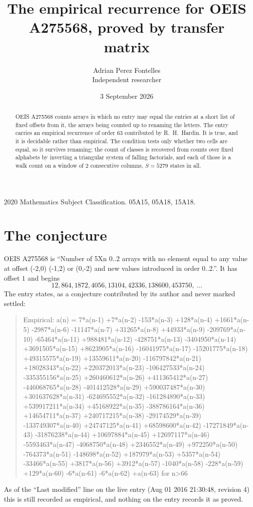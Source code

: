 \documentclass[11pt,a4paper]{article}
\title{The empirical recurrence for OEIS A275568, proved by transfer matrix}
\author{Adrian Perez Fontelles\\ \small Independent researcher}
\date{3 September 2026}
\theoremstyle{plain}
\theoremstyle{definition}
\begin{document}
\maketitle

\begin{abstract}
OEIS A275568 counts arrays in which no entry may equal the entries at a short list of fixed offsets
from it, the arrays being counted up to renaming the letters. The entry carries an empirical
recurrence of order $63$ contributed by R.~H.~Hardin. It is true, and it is decidable
rather than empirical. The condition tests only whether two cells are equal, so it survives
renaming; the count of classes is recovered from counts over fixed alphabets by inverting a
triangular system of falling factorials, and each of those is a walk count on a window of
$2$ consecutive columns, $S=5279$ states in all.
\end{abstract}

\noindent\small 2020 Mathematics Subject Classification. 05A15, 05A18, 15A18.\normalsize

\section{The conjecture}

OEIS A275568 is ``Number of 5Xn 0..2 arrays with no element equal to any value at offset (-2,0) (-1,2) or (0,-2) and new values introduced in order 0..2.''. It has offset $1$ and begins
\[
12, 864, 1872, 4056, 13104, 42336, 138600, 453750,\ \dots
\]
The entry states, as a conjecture contributed by its author and never marked settled:
\begin{quote}
Empirical: a(n) = 7*a(n-1) +7*a(n-2) -153*a(n-3) +128*a(n-4) +1661*a(n-5) -2987*a(n-6) -11147*a(n-7) +31265*a(n-8) +44933*a(n-9) -209769*a(n-10) -65464*a(n-11) +988481*a(n-12) -428751*a(n-13) -3404950*a(n-14) +3691505*a(n-15) +8623905*a(n-16) -16041975*a(n-17) -15201775*a(n-18) +49315575*a(n-19) +13559611*a(n-20) -116797842*a(n-21) +18028343*a(n-22) +220372013*a(n-23) -106427533*a(n-24) -335355156*a(n-25) +260460612*a(n-26) +411365412*a(n-27) -446068765*a(n-28) -401412528*a(n-29) +590037487*a(n-30) +301637628*a(n-31) -624695552*a(n-32) -161284890*a(n-33) +539917211*a(n-34) +45168922*a(n-35) -388786164*a(n-36) +14654711*a(n-37) +240717215*a(n-38) -29174529*a(n-39) -133749307*a(n-40) +24747125*a(n-41) +68598600*a(n-42) -17271849*a(n-43) -31876238*a(n-44) +10697884*a(n-45) +12697117*a(n-46) -5593463*a(n-47) -4068750*a(n-48) +2346552*a(n-49) +972250*a(n-50) -764373*a(n-51) -148698*a(n-52) +187979*a(n-53) +5357*a(n-54) -33466*a(n-55) +3817*a(n-56) +3912*a(n-57) -1040*a(n-58) -228*a(n-59) +129*a(n-60) -6*a(n-61) -6*a(n-62) +a(n-63) for n>66
\end{quote}
As of the ``Last modified'' line on the live entry (Aug 01 2016 21:30:48, revision 4) this is still
recorded as empirical, and nothing on the entry records it as proved.
\end{document}
